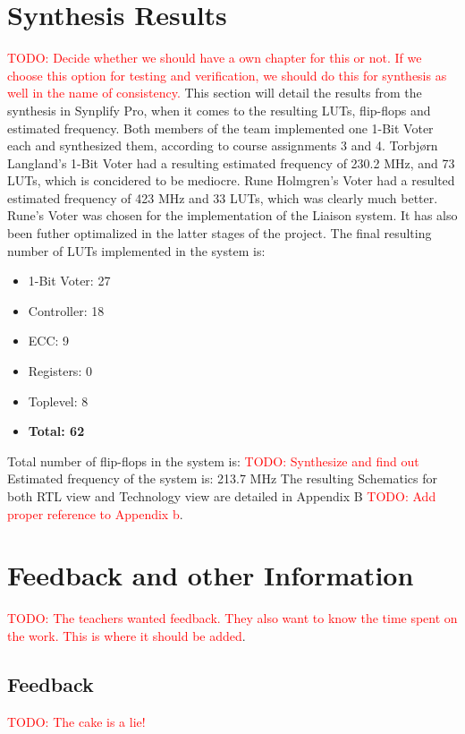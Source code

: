 \documentclass[a4paper]{IEEEtran}
\newcommand\TODO[1]{\textcolor{red}{TODO:#1}}
\newcommand\todo[1]{\TODO{#1}}
\begin{document}
\section{Synthesis Results}
\todo{ Decide whether we should have a own chapter for this or not. If we choose this option for testing and verification, we should do this for synthesis as well in the name of consistency. }
This section will detail the results from the synthesis in Synplify Pro, when it comes to the resulting LUTs, flip-flops and estimated frequency.
\break
\break
Both members of the team implemented one 1-Bit Voter each and synthesized them, according to course assignments 3 and 4.
Torbjørn Langland's 1-Bit Voter had a resulting estimated frequency of 230.2 MHz, and 73 LUTs, which is concidered to be mediocre.
Rune Holmgren's Voter had a resulted estimated frequency of 423 MHz and 33 LUTs, which was clearly much better.
Rune's Voter was chosen for the implementation of the Liaison system.
It has also been futher optimalized in the latter stages of the project.
The final resulting number of LUTs implemented in the system is:
\begin{itemize}
    \item 1-Bit Voter: 27
    \item Controller: 18
    \item ECC: 9
    \item Registers: 0
    \item Toplevel: 8
    \item \textbf{Total: 62}
\end{itemize}
Total number of flip-flops in the system is: \todo{ Synthesize and find out}
\break
Estimated frequency of the system is: 213.7 MHz
\break
The resulting Schematics for both RTL view and Technology view are detailed in Appendix B \todo{ Add proper reference to Appendix b}.

\section{Feedback and other Information}
\todo{ The teachers wanted feedback. They also want to know the time spent on the work. This is where it should be added}.
\subsection{Feedback}
\todo{ The cake is a lie!}
\end{document}
